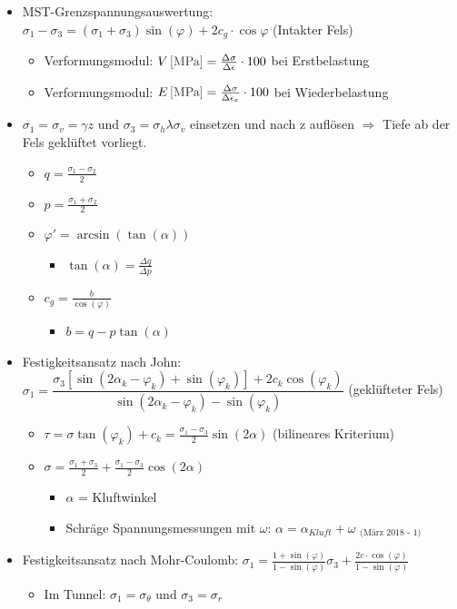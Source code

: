 \documentclass[fleqn,twoside]{article}
\newcommand{\un}[2]{{\unit[#1]{\color{black!80}[#2]}}}
\begin{document}
\begin{itemize}
    \item MST-Grenzspannungsauswertung: $\sigma_1-\sigma_3=(\sigma_1+\sigma_3)\sin(\varphi)+2c_g\cdot\cos{\varphi}$ (Intakter Fels)
    \begin{itemize}
        \item Verformungsmodul: $\un{V}{MPa}=\frac{\Delta\sigma}{\Delta\epsilon}\cdot 100$ bei Erstbelastung
        \item Verformungsmodul: $\un{E}{MPa}=\frac{\Delta\sigma}{\Delta\epsilon_e}\cdot 100$ bei Wiederbelastung
    \end{itemize}
    \item $\sigma_1 = \sigma_v = \gamma z$ und $\sigma_3 = \sigma_h \lambda \sigma_v$ einsetzen und nach z auflösen $\Rightarrow$ Tiefe ab der Fels geklüftet vorliegt.
    \begin{itemize}
        \item $q=\frac{\sigma_1-\sigma_2}{2}$
        \item $p=\frac{\sigma_1+\sigma_2}{2}$
        \item $\varphi'=\arcsin(\tan(\alpha))$
        \begin{itemize}
            \item $\tan(\alpha)=\frac{\Delta q}{\Delta p}$
        \end{itemize}
        \item $c_g=\frac{b}{\cos(\varphi)}$
        \begin{itemize}
            \item $b=q-p\tan(\alpha)$
        \end{itemize}
    \end{itemize}
    \item Festigkeitsansatz nach John: $\sigma_1=\dfrac{\sigma_3\left[\sin(2\alpha_k-\varphi_k)+\sin(\varphi_k)\right]+2c_k\cos(\varphi_k)}{\sin(2\alpha_k-\varphi_k)-\sin(\varphi_k)}$ (geklüfteter Fels)
    \begin{itemize}
    \item $\tau=\sigma\tan(\varphi_k)+c_k=\frac{\sigma_1-\sigma_3}{2}\sin(2\alpha)$ (bilineares Kriterium)
    \item $\sigma=\frac{\sigma_1+\sigma_3}{2}+\frac{\sigma_1-\sigma_3}{2}\cos(2\alpha)$
    \begin{itemize}
        \item $\alpha$ = Kluftwinkel
        \item Schräge Spannungsmessungen mit $\omega$: $\alpha = \alpha_{Kluft} + \omega$ $_{\text{(März 2018 - 1)}}$
    \end{itemize}
    \end{itemize}
    \item Festigkeitsansatz nach Mohr-Coulomb: $\sigma_1=\frac{1+\sin(\varphi)}{1-\sin(\varphi)}\sigma_3+\frac{2c\cdot\cos(\varphi)}{1-\sin(\varphi)}$
    \begin{itemize}
        \item Im Tunnel: $\sigma_1=\sigma_{\theta}$ und $\sigma_3=\sigma_r$
    \end{itemize}
\end{itemize}
\end{document}
